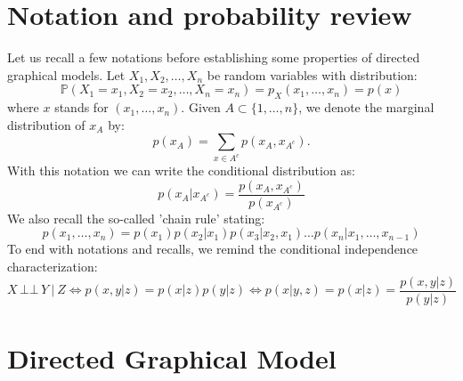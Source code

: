 \documentclass[12pt]{report}
\newcommand{\indep}{\ensuremath{\,\bot\!\!\!\bot\,}} %
\begin{document}
 
 

\maketitle



\section{Notation and probability review}


Let us recall a few notations before establishing some properties of directed graphical models. Let $X_1, X_2, \dots, X_n$ be random variables with distribution: 
\begin{equation*}
\mathbb{P}(X_1 = x_1, X_2 = x_2, \dots, X_n = x_n) = p_X (x_1, \dots, x_n) = p(x)
\end{equation*}
where $x$ stands for $(x_1, \dots, x_n)$. Given $A\subset \{1, \dots, n\}$, we denote the marginal distribution of $x_A$ by: 
\begin{equation*}
p(x_A) = \sum_{x\in {A^c}} p(x_A, x_{A^c}).
\end{equation*}
With this notation we can write the conditional distribution as: 
\begin{equation*}
p( x_A | x_{A^c} ) = \frac{p(x_A, x_{A^c})}{p(x_{A^c})}
\end{equation*}
We also recall the so-called 'chain rule' stating:
\begin{equation*}
p(x_1, \dots, x_n) = p(x_1) p(x_2 | x_1) p(x_3 | x_2, x_1) \dots p(x_n | x_1, \dots, x_{n-1})
\end{equation*}
To end with notations and recalls, we remind the conditional independence characterization: 
\begin{equation*}
X\indep Y \ | \ Z \Leftrightarrow p\left(x,y|z\right)=p\left(x|z\right)p\left(y|z\right) \Leftrightarrow p\left(x|y,z\right)=p\left(x|z\right)=\frac{p\left(x,y|z\right)}{p\left(y|z\right)}
\end{equation*}





\section{Directed Graphical Model}
\end{document}
